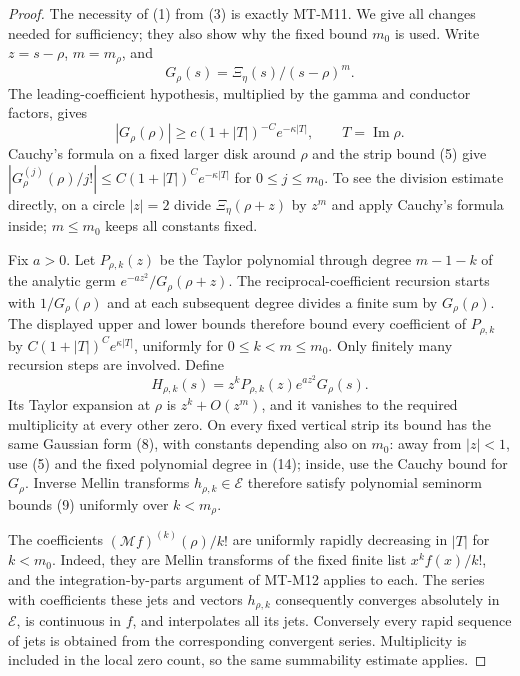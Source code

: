 \documentclass[11pt,a4paper]{article}
\begin{document}
\begin{proof}
The necessity of (1) from (3) is exactly MT-M11.
We give all changes needed for sufficiency; they also show why
the fixed bound $m_0$ is used.
Write $z=s-\rho$, $m=m_\rho$, and
\[
                  G_\rho(s)=\Xi_\eta(s)/(s-\rho)^m .
\]
The leading-coefficient hypothesis, multiplied by the gamma
and conductor factors, gives
\[
 |G_\rho(\rho)|\ge c(1+|T|)^{-C}e^{-\kappa|T|},
           \qquad T=\operatorname{Im}\rho.
\]
Cauchy's formula on a fixed larger disk around $\rho$ and
the strip bound (5) give
$|G_\rho^{(j)}(\rho)/j!|
 \le C(1+|T|)^C e^{-\kappa|T|}$ for $0\le j\le m_0$.
To see the division estimate directly, on a circle $|z|=2$
divide $\Xi_\eta(\rho+z)$ by $z^m$ and apply Cauchy's
formula inside; $m\le m_0$ keeps all constants fixed.

Fix $a>0$. Let $P_{\rho,k}(z)$ be the Taylor polynomial
through degree $m-1-k$ of the analytic germ
$e^{-az^2}/G_\rho(\rho+z)$.
The reciprocal-coefficient recursion starts with
$1/G_\rho(\rho)$ and at each subsequent degree divides
a finite sum by $G_\rho(\rho)$. The displayed upper and
lower bounds therefore bound every coefficient of
$P_{\rho,k}$ by
$C(1+|T|)^C e^{\kappa|T|}$, uniformly for
$0\le k<m\le m_0$. Only finitely many recursion steps
are involved. Define
\[
 H_{\rho,k}(s)=
      z^kP_{\rho,k}(z)e^{az^2}G_\rho(s).                \tag{14}
\]
Its Taylor expansion at $\rho$ is
$z^k+O(z^m)$, and it vanishes to the required multiplicity
at every other zero. On every fixed vertical strip its
bound has the same Gaussian form (8), with constants
depending also on $m_0$: away from $|z|<1$, use (5)
and the fixed polynomial degree in (14); inside,
use the Cauchy bound for $G_\rho$.
Inverse Mellin transforms $h_{\rho,k}\in\mathcal E$
therefore satisfy polynomial seminorm bounds (9)
uniformly over $k<m_\rho$.

The coefficients $(\mathcal Mf)^{(k)}(\rho)/k!$ are
uniformly rapidly decreasing in $|T|$ for
$k<m_0$. Indeed, they are Mellin transforms of the
fixed finite list $x^k f(x)/k!$, and the
integration-by-parts argument of MT-M12 applies to
each. The series with coefficients these jets and
vectors $h_{\rho,k}$ consequently converges absolutely
in $\mathcal E$, is continuous in $f$, and interpolates
all its jets. Conversely every rapid sequence of jets
is obtained from the corresponding convergent series.
Multiplicity is included in the local zero count,
so the same summability estimate applies.


\end{proof}
\end{document}
